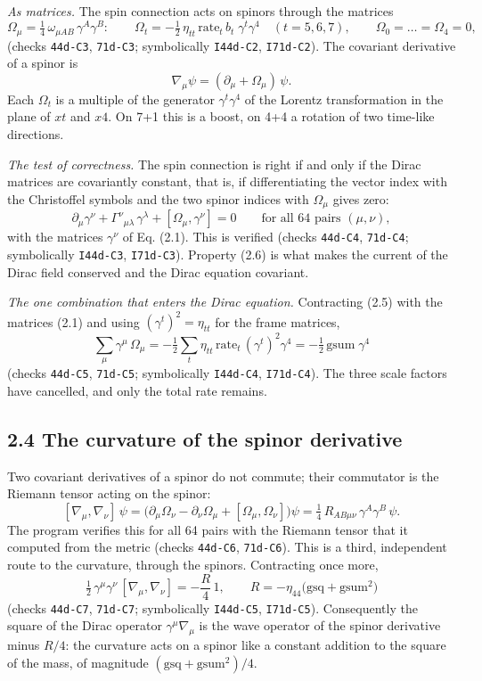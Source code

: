 \documentclass[
  10pt,
]{article}
\begin{document}
\emph{As matrices.} The spin connection acts on spinors through the
matrices \[\Omega_\mu=\tfrac14\,\omega_{\mu AB}\,\gamma^A\gamma^B:\qquad
\Omega_t=-\tfrac12\,\eta_{tt}\,\mathrm{rate}_t\,b_t\;\gamma^t\gamma^4\quad(t=5,6,7),\qquad
\Omega_0=\dots=\Omega_4=0,\tag{2.5}\] (checks \texttt{44d-C3},
\texttt{71d-C3}; symbolically \texttt{I44d-C2}, \texttt{I71d-C2}). The
covariant derivative of a spinor is
\[\nabla_\mu\psi=(\partial_\mu+\Omega_\mu)\,\psi .\] Each \(\Omega_t\)
is a multiple of the generator \(\gamma^t\gamma^4\) of the Lorentz
transformation in the plane of \(xt\) and \(x4\). On 7+1 this is a
boost, on 4+4 a rotation of two time-like directions.

\emph{The test of correctness.} The spin connection is right if and only
if the Dirac matrices are covariantly constant, that is, if
differentiating the vector index with the Christoffel symbols and the
two spinor indices with \(\Omega_\mu\) gives zero:
\[\partial_\mu\gamma^\nu+\Gamma^\nu{}_{\mu\lambda}\,\gamma^\lambda+[\Omega_\mu,\gamma^\nu]=0
\qquad\text{for all 64 pairs }(\mu,\nu),\tag{2.6}\] with the matrices
\(\gamma^\nu\) of Eq. (2.1). This is verified (checks \texttt{44d-C4},
\texttt{71d-C4}; symbolically \texttt{I44d-C3}, \texttt{I71d-C3}).
Property (2.6) is what makes the current of the Dirac field conserved
and the Dirac equation covariant.

\emph{The one combination that enters the Dirac equation.} Contracting
(2.5) with the matrices (2.1) and using \((\gamma^t)^2=\eta_{tt}\) for
the frame matrices,
\[\sum_\mu\gamma^\mu\,\Omega_\mu=-\tfrac12\sum_t\eta_{tt}\,\mathrm{rate}_t\,(\gamma^t)^2\gamma^4
=-\tfrac12\,\mathrm{gsum}\;\gamma^4 \tag{2.7}\] (checks \texttt{44d-C5},
\texttt{71d-C5}; symbolically \texttt{I44d-C4}, \texttt{I71d-C4}). The
three scale factors have cancelled, and only the total rate remains.

\hypertarget{the-curvature-of-the-spinor-derivative}{%
\subsection{2.4 The curvature of the spinor
derivative}\label{the-curvature-of-the-spinor-derivative}}

Two covariant derivatives of a spinor do not commute; their commutator
is the Riemann tensor acting on the spinor:
\[[\nabla_\mu,\nabla_\nu]\,\psi=\big(\partial_\mu\Omega_\nu-\partial_\nu\Omega_\mu+[\Omega_\mu,\Omega_\nu]\big)\psi
=\tfrac14\,R_{AB\mu\nu}\,\gamma^A\gamma^B\,\psi .\tag{2.8}\] The program
verifies this for all 64 pairs with the Riemann tensor that it computed
from the metric (checks \texttt{44d-C6}, \texttt{71d-C6}). This is a
third, independent route to the curvature, through the spinors.
Contracting once more,
\[\tfrac12\,\gamma^\mu\gamma^\nu\,[\nabla_\mu,\nabla_\nu]=-\frac R4\,1,\qquad
R=-\eta_{44}\big(\mathrm{gsq}+\mathrm{gsum}^2\big)\tag{2.9}\] (checks
\texttt{44d-C7}, \texttt{71d-C7}; symbolically \texttt{I44d-C5},
\texttt{I71d-C5}). Consequently the square of the Dirac operator
\(\gamma^\mu\nabla_\mu\) is the wave operator of the spinor derivative
minus \(R/4\): the curvature acts on a spinor like a constant addition
to the square of the mass, of magnitude
\((\mathrm{gsq}+\mathrm{gsum}^2)/4\).
\end{document}
